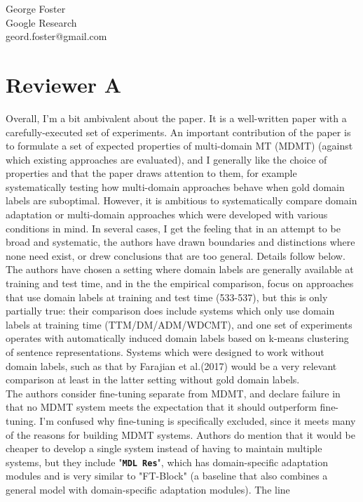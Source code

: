 \documentclass[12pt,times,a4paper,twoside]{article}
\theoremstyle{definition}
\newcommand{\system}[1]{\texttt{\textbf{#1}}}
\begin{document}
\noindent George Foster\\
\noindent Google Research\\
\noindent geord.foster@gmail.com

\section*{Reviewer A}

Overall, I'm a bit ambivalent about the paper. It is a well-written paper with a carefully-executed set of experiments. An important contribution of the paper is to formulate a set of expected properties of multi-domain MT (MDMT) (against which existing approaches are evaluated), and I generally like the choice of properties and that the paper draws attention to them, for example systematically testing how multi-domain approaches behave when gold domain labels are suboptimal. However, it is ambitious to systematically compare domain adaptation or multi-domain approaches which were developed with various conditions in mind. In several cases, I get the feeling that in an attempt to be broad and systematic, the authors have drawn boundaries and distinctions where none need exist, or drew conclusions that are too general. Details follow below.
\\
The authors have chosen a setting where domain labels are generally
available at training and test time, and in the the empirical comparison, focus on approaches that use domain labels at training and test time (533-537), but this is only partially true: their comparison does include systems which only use domain labels at training time (TTM/DM/ADM/WDCMT), and one set of experiments operates with automatically induced domain labels based on k-means clustering of sentence representations. Systems which were designed to work without domain labels, such as that by Farajian et al.(2017) would be a very relevant comparison at least in the latter setting without gold domain labels.
\\
The authors consider fine-tuning separate from MDMT, and declare failure in that no MDMT system meets the expectation that it should outperform fine-tuning. I'm confused why fine-tuning is specifically excluded, since it meets many of the reasons for building MDMT systems. Authors do mention that it would be cheaper to develop a single system instead of having to maintain multiple systems, but they include "\system{MDL Res}", which has domain-specific adaptation modules and is very similar to "FT-Block" (a baseline that also combines a general model with domain-specific adaptation modules). The line
\end{document}
